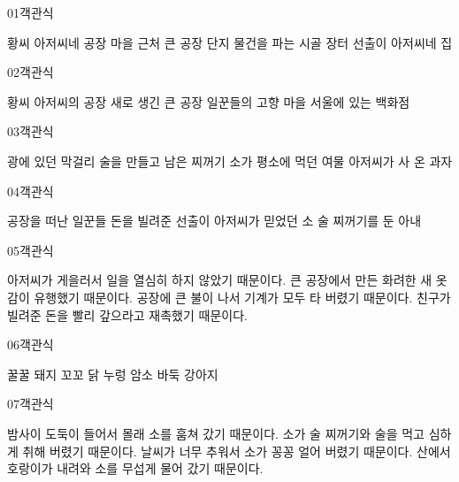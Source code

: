 \documentclass[fs95,seriesFre]{korfarm-base}
\begin{document}
\begin{kfQBlock}{01}{객관식}
\begin{kfChoices}
\kfChoice 황씨 아저씨네 공장
\kfChoice 마을 근처 큰 공장 단지
\kfChoice 물건을 파는 시골 장터
\kfChoice 선출이 아저씨네 집
\end{kfChoices}
\end{kfQBlock}
\begin{kfQBlock}{02}{객관식}
\begin{kfChoices}
\kfChoice 황씨 아저씨의 공장
\kfChoice 새로 생긴 큰 공장
\kfChoice 일꾼들의 고향 마을
\kfChoice 서울에 있는 백화점
\end{kfChoices}
\end{kfQBlock}
\begin{kfQBlock}{03}{객관식}
\begin{kfChoices}
\kfChoice 광에 있던 막걸리
\kfChoice 술을 만들고 남은 찌꺼기
\kfChoice 소가 평소에 먹던 여물
\kfChoice 아저씨가 사 온 과자
\end{kfChoices}
\end{kfQBlock}
\begin{kfQBlock}{04}{객관식}
\begin{kfChoices}
\kfChoice 공장을 떠난 일꾼들
\kfChoice 돈을 빌려준 선출이
\kfChoice 아저씨가 믿었던 소
\kfChoice 술 찌꺼기를 둔 아내
\end{kfChoices}
\end{kfQBlock}
\begin{kfQBlock}{05}{객관식}
\begin{kfChoices}
\kfChoice 아저씨가 게을러서 일을 열심히 하지 않았기 때문이다.
\kfChoice 큰 공장에서 만든 화려한 새 옷감이 유행했기 때문이다.
\kfChoice 공장에 큰 불이 나서 기계가 모두 타 버렸기 때문이다.
\kfChoice 친구가 빌려준 돈을 빨리 갚으라고 재촉했기 때문이다.
\end{kfChoices}
\end{kfQBlock}
\begin{kfQBlock}{06}{객관식}
\begin{kfChoices}
\kfChoice 꿀꿀 돼지
\kfChoice 꼬꼬 닭
\kfChoice 누렁 암소
\kfChoice 바둑 강아지
\end{kfChoices}
\end{kfQBlock}
\begin{kfQBlock}{07}{객관식}
\begin{kfChoices}
\kfChoice 밤사이 도둑이 들어서 몰래 소를 훔쳐 갔기 때문이다.
\kfChoice 소가 술 찌꺼기와 술을 먹고 심하게 취해 버렸기 때문이다.
\kfChoice 날씨가 너무 추워서 소가 꽁꽁 얼어 버렸기 때문이다.
\kfChoice 산에서 호랑이가 내려와 소를 무섭게 물어 갔기 때문이다.
\end{kfChoices}
\end{kfQBlock}
\end{document}
